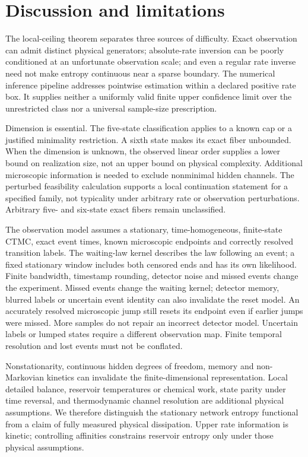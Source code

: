 \documentclass[aps,pre,onecolumn,11pt,longbibliography,notitlepage]{revtex4-2}
\newcommand{\1}{\mathbf 1}
\begin{document}



\section{Discussion and limitations}\label{sec:limitations}
The local-ceiling theorem separates three sources of difficulty. Exact observation can admit distinct physical generators; absolute-rate inversion can be poorly conditioned at an unfortunate observation scale; and even a regular rate inverse need not make entropy continuous near a sparse boundary. The numerical inference pipeline addresses pointwise estimation within a declared positive rate box. It supplies neither a uniformly valid finite upper confidence limit over the unrestricted class nor a universal sample-size prescription.

Dimension is essential. The five-state classification applies to a known cap or a justified minimality restriction. A sixth state makes its exact fiber unbounded. When the dimension is unknown, the observed linear order supplies a lower bound on realization size, not an upper bound on physical complexity. Additional microscopic information is needed to exclude nonminimal hidden channels. The perturbed feasibility calculation supports a local continuation statement for a specified family, not typicality under arbitrary rate or observation perturbations. Arbitrary five- and six-state exact fibers remain unclassified.

The observation model assumes a stationary, time-homogeneous, finite-state CTMC, exact event times, known microscopic endpoints and correctly resolved transition labels. The waiting-law kernel describes the law following an event; a fixed stationary window includes both censored ends and has its own likelihood. Finite bandwidth, timestamp rounding, detector noise and missed events change the experiment. Missed events change the waiting kernel; detector memory, blurred labels or uncertain event identity can also invalidate the reset model. An accurately resolved microscopic jump still resets its endpoint even if earlier jumps were missed. More samples do not repair an incorrect detector model. Uncertain labels or lumped states require a different observation map. Finite temporal resolution and lost events must not be conflated.

Nonstationarity, continuous hidden degrees of freedom, memory and non-Markovian kinetics can invalidate the finite-dimensional representation. Local detailed balance, reservoir temperatures or chemical work, state parity under time reversal, and thermodynamic channel resolution are additional physical assumptions. We therefore distinguish the stationary network entropy functional from a claim of fully measured physical dissipation. Upper rate information is kinetic; controlling affinities constrains reservoir entropy only under those physical assumptions.
\end{document}

